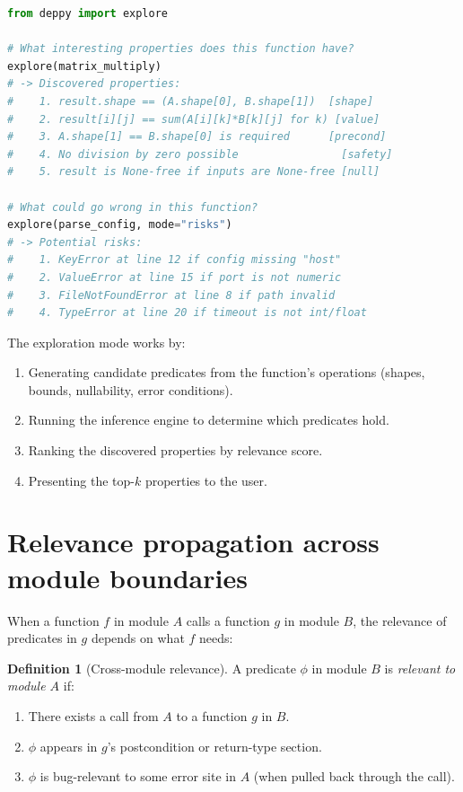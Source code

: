 \documentclass[11pt]{report}
\theoremstyle{definition}
\newtheorem{definition}{Definition}[section]
\theoremstyle{plain}
\begin{document}
\begin{lstlisting}[style=deppy,language=Python]
from deppy import explore

# What interesting properties does this function have?
explore(matrix_multiply)
# -> Discovered properties:
#    1. result.shape == (A.shape[0], B.shape[1])  [shape]
#    2. result[i][j] == sum(A[i][k]*B[k][j] for k) [value]
#    3. A.shape[1] == B.shape[0] is required      [precond]
#    4. No division by zero possible                [safety]
#    5. result is None-free if inputs are None-free [null]

# What could go wrong in this function?
explore(parse_config, mode="risks")
# -> Potential risks:
#    1. KeyError at line 12 if config missing "host"
#    2. ValueError at line 15 if port is not numeric
#    3. FileNotFoundError at line 8 if path invalid
#    4. TypeError at line 20 if timeout is not int/float
\end{lstlisting}

The exploration mode works by:
\begin{enumerate}[nosep]
  \item Generating candidate predicates from the function's operations
        (shapes, bounds, nullability, error conditions).
  \item Running the inference engine to determine which predicates hold.
  \item Ranking the discovered properties by relevance score.
  \item Presenting the top-$k$ properties to the user.
\end{enumerate}

\section{Relevance propagation across module boundaries}

When a function $f$ in module $A$ calls a function $g$ in module $B$, the
relevance of predicates in $g$ depends on what $f$ needs:

\begin{definition}[Cross-module relevance]
A predicate $\phi$ in module $B$ is \emph{relevant to module $A$} if:
\begin{enumerate}[nosep]
  \item There exists a call from $A$ to a function $g$ in $B$.
  \item $\phi$ appears in $g$'s postcondition or return-type section.
  \item $\phi$ is bug-relevant to some error site in $A$ (when pulled back
        through the call).
\end{enumerate}
\end{definition}
\end{document}
